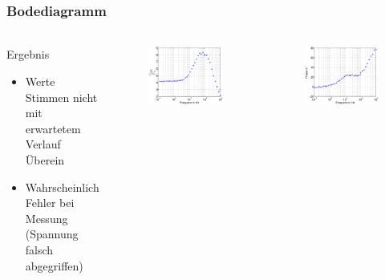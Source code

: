\begin{frame}
\frametitle{Bodediagramm}
\framesubtitle{}
    \begin{columns}[c]
    \begin{block}{Ergebnis}
        \begin{itemize}
            \item Werte Stimmen nicht mit erwartetem Verlauf Überein
            \item Wahrscheinlich Fehler bei Messung (Spannung falsch
            abgegriffen)
        \end{itemize}
    \end{block}
    \begin{figure}[H]
    \begin{center}
            \includegraphics[scale=0.3]{./img/plots/Auf_3_bode_U.eps}
    \end{center}
    \end{figure}
    \begin{figure}[H]
    \begin{center}
            \includegraphics[scale=0.3]{./img/plots/Auf_3_bode_ph.eps}
    \end{center}
    \end{figure}
    
    \end{columns}
\end{frame}
